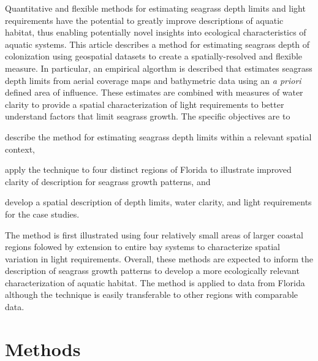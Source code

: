 \documentclass[letterpaper,12pt,oneside]{article}\usepackage[]{graphicx}\usepackage[]{color}
\begin{document}
Quantitative and flexible methods for estimating seagrass depth limits and light requirements have the potential to greatly improve descriptions of aquatic habitat, thus enabling potentially novel insights into ecological characteristics of aquatic systems.  This article describes a method for estimating seagrass depth of colonization using geospatial datasets to create a spatially-resolved and flexible measure.  In particular, an empirical algorthm is described that estimates seagrass depth limits from aerial coverage maps and bathymetric data using an \textit{a priori} defined area of influence. These estimates are combined with measures of water clarity to provide a spatial characterization of light requirements to better understand factors that limit seagrass growth.  The specific objectives are to\begin{inparaenum}[1\upshape)]
\item describe the method for estimating seagrass depth limits within a relevant spatial context, 
\item apply the technique to four distinct regions of Florida to illustrate improved clarity of description for seagrass growth patterns, and
\item develop a spatial description of depth limits, water clarity, and light requirements for the case studies.  
\end{inparaenum}
The method is first illustrated using four relatively small areas of larger coastal regions folowed by extension to entire bay systems to characterize spatial variation in light requirements.  Overall, these methods are expected to inform the description of seagrass growth patterns to develop a more ecologically relevant characterization of aquatic habitat.  The method is applied to data from Florida although the technique is easily transferable to other regions with comparable data. 

\section{Methods}
\end{document}
